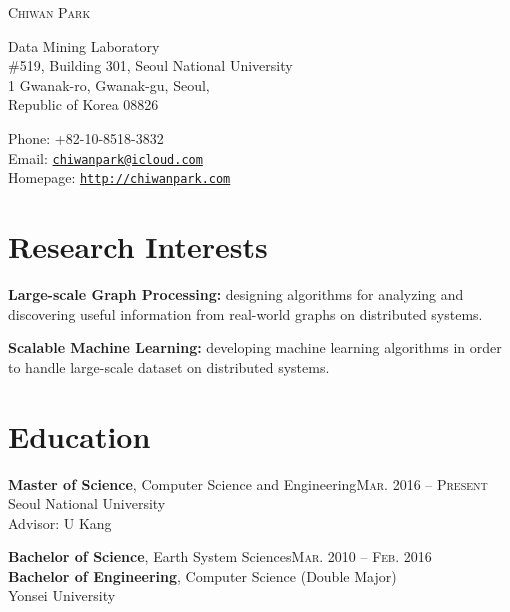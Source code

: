 \documentclass[11pt,a4paper]{article}
\makeatletter
\def\myname{Chiwan Park}
\def\myphone{+82-10-8518-3832}
\def\myaddress{Data Mining Laboratory\\
\#519, Building 301, Seoul National University\\
1 Gwanak-ro, Gwanak-gu, Seoul,\\
Republic of Korea 08826}
\def\myemail{chiwanpark@icloud.com}
\def\myhomepage{http://chiwanpark.com}
\renewenvironment{itemize}{
  \begin{list}{}{
    \setlength{\leftmargin}{1.5em}
    \setlength{\itemsep}{0.5em}
    \setlength{\parskip}{0pt}
    \setlength{\parsep}{0.25em}
  }
}{
  \end{list}
}
\makeatother
\begin{document}
\par{\Huge \textsc{\myname}}

\bigskip

\begin{minipage}[t]{0.495\textwidth}
  \myaddress
\end{minipage}
\begin{minipage}[t]{0.495\textwidth}
  Phone: \myphone \\
  Email: \href{mailto:\myemail}{\tt \myemail} \\
  Homepage: \href{\myhomepage}{\tt \myhomepage}
\end{minipage}

\section*{Research Interests}
\begin{itemize}
  \item \textbf{Large-scale Graph Processing:} designing algorithms for analyzing and discovering useful information from real-world graphs on distributed systems.
  \item \textbf{Scalable Machine Learning:} developing machine learning algorithms in order to handle large-scale dataset on distributed systems.
\end{itemize}

\section*{Education}
\begin{itemize}
  \item \textbf{Master of Science}, Computer Science and Engineering\hfill\textsc{Mar. 2016 -- Present}\\
        Seoul National University\\
        Advisor: U Kang
  \item \textbf{Bachelor of Science}, Earth System Sciences\hfill\textsc{Mar. 2010 -- Feb. 2016}\\
        \textbf{Bachelor of Engineering}, Computer Science (Double Major)\\
        Yonsei University
\end{itemize}

\end{document}
